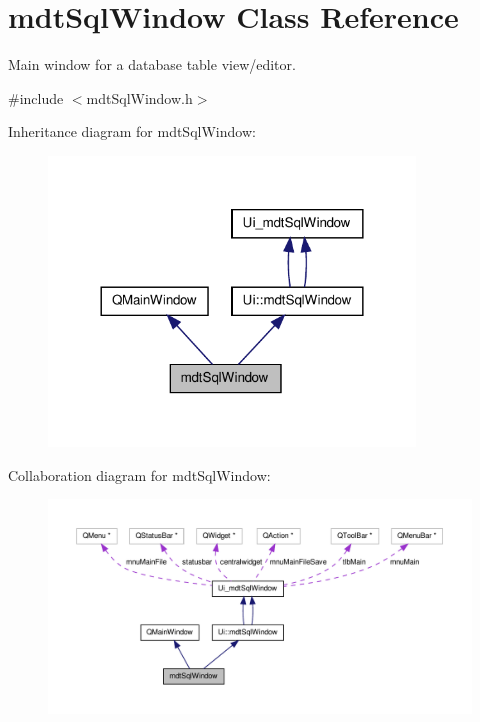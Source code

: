 \hypertarget{classmdt_sql_window}{\section{mdt\-Sql\-Window Class Reference}
\label{classmdt_sql_window}
}


Main window for a database table view/editor.  




{\ttfamily \#include $<$mdt\-Sql\-Window.\-h$>$}



Inheritance diagram for mdt\-Sql\-Window\-:\nopagebreak
\begin{figure}[H]
\begin{center}
\leavevmode
\includegraphics[width=276pt]{classmdt_sql_window__inherit__graph}
\end{center}
\end{figure}


Collaboration diagram for mdt\-Sql\-Window\-:\nopagebreak
\begin{figure}[H]
\begin{center}
\leavevmode
\includegraphics[width=350pt]{classmdt_sql_window__coll__graph}
\end{center}
\end{figure}
